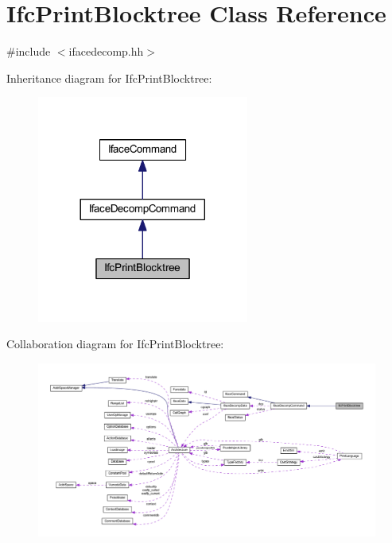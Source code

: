 \hypertarget{class_ifc_print_blocktree}{}\section{Ifc\+Print\+Blocktree Class Reference}
\label{class_ifc_print_blocktree}


{\ttfamily \#include $<$ifacedecomp.\+hh$>$}



Inheritance diagram for Ifc\+Print\+Blocktree\+:
\nopagebreak
\begin{figure}[H]
\begin{center}
\leavevmode
\includegraphics[width=197pt]{class_ifc_print_blocktree__inherit__graph}
\end{center}
\end{figure}


Collaboration diagram for Ifc\+Print\+Blocktree\+:
\nopagebreak
\begin{figure}[H]
\begin{center}
\leavevmode
\includegraphics[width=350pt]{class_ifc_print_blocktree__coll__graph}
\end{center}
\end{figure}
